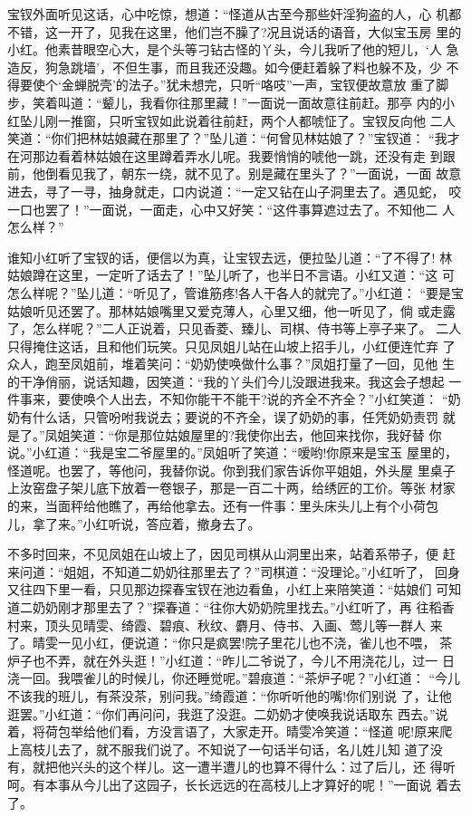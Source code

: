 宝钗外面听见这话，心中吃惊，想道：“怪道从古至今那些奸淫狗盗的人，心
机都不错，这一开了，见我在这里，他们岂不臊了?况且说话的语音，大似宝玉房
里的小红。他素昔眼空心大，是个头等刁钻古怪的丫头，今儿我听了他的短儿，‘人
急造反，狗急跳墙’，不但生事，而且我还没趣。如今便赶着躲了料也躲不及，少
不得要使个‘金蝉脱壳’的法子。”犹未想完，只听“咯吱”一声，宝钗便故意放
重了脚步，笑着叫道：“颦儿，我看你往那里藏！”一面说一面故意往前赶。那亭
内的小红坠儿刚一推窗，只听宝钗如此说着往前赶，两个人都唬怔了。宝钗反向他
二人笑道：“你们把林姑娘藏在那里了？”坠儿道：“何曾见林姑娘了？”宝钗道：
“我才在河那边看着林姑娘在这里蹲着弄水儿呢。我要悄悄的唬他一跳，还没有走
到跟前，他倒看见我了，朝东一绕，就不见了。别是藏在里头了？”一面说，一面
故意进去，寻了一寻，抽身就走，口内说道：“一定又钻在山子洞里去了。遇见蛇，
咬一口也罢了！”一面说，一面走，心中又好笑：“这件事算遮过去了。不知他二
人怎么样？”

谁知小红听了宝钗的话，便信以为真，让宝钗去远，便拉坠儿道：“了不得了!
林姑娘蹲在这里，一定听了话去了！”坠儿听了，也半日不言语。小红又道：“这
可怎么样呢？”坠儿道：“听见了，管谁筋疼!各人干各人的就完了。”小红道：
“要是宝姑娘听见还罢了。那林姑娘嘴里又爱克薄人，心里又细，他一听见了，倘
或走露了，怎么样呢？”二人正说着，只见香菱、臻儿、司棋、侍书等上亭子来了。
二人只得掩住这话，且和他们玩笑。只见凤姐儿站在山坡上招手儿，小红便连忙弃
了众人，跑至凤姐前，堆着笑问：“奶奶使唤做什么事？”凤姐打量了一回，见他
生的干净俏丽，说话知趣，因笑道：“我的丫头们今儿没跟进我来。我这会子想起
一件事来，要使唤个人出去，不知你能干不能干?说的齐全不齐全？”小红笑道：
“奶奶有什么话，只管吩咐我说去；要说的不齐全，误了奶奶的事，任凭奶奶责罚
就是了。”凤姐笑道：“你是那位姑娘屋里的?我使你出去，他回来找你，我好替
你说。”小红道：“我是宝二爷屋里的。”凤姐听了笑道：“嗳哟!你原来是宝玉
屋里的，怪道呢。也罢了，等他问，我替你说。你到我们家告诉你平姐姐，外头屋
里桌子上汝窑盘子架儿底下放着一卷银子，那是一百二十两，给绣匠的工价。等张
材家的来，当面秤给他瞧了，再给他拿去。还有一件事：里头床头儿上有个小荷包
儿，拿了来。”小红听说，答应着，撤身去了。

不多时回来，不见凤姐在山坡上了，因见司棋从山洞里出来，站着系带子，便
赶来问道：“姐姐，不知道二奶奶往那里去了？”司棋道：“没理论。”小红听了，
回身又往四下里一看，只见那边探春宝钗在池边看鱼，小红上来陪笑道：“姑娘们
可知道二奶奶刚才那里去了？”探春道：“往你大奶奶院里找去。”小红听了，再
往稻香村来，顶头见晴雯、绮霞、碧痕、秋纹、麝月、侍书、入画、莺儿等一群人
来了。晴雯一见小红，便说道：“你只是疯罢!院子里花儿也不浇，雀儿也不喂，
茶炉子也不弄，就在外头逛！”小红道：“昨儿二爷说了，今儿不用浇花儿，过一
日浇一回。我喂雀儿的时候儿，你还睡觉呢。”碧痕道：“茶炉子呢？”小红道：
“今儿不该我的班儿，有茶没茶，别问我。”绮霞道：“你听听他的嘴!你们别说
了，让他逛罢。”小红道：“你们再问问，我逛了没逛。二奶奶才使唤我说话取东
西去。”说着，将荷包举给他们看，方没言语了，大家走开。晴雯冷笑道：“怪道
呢!原来爬上高枝儿去了，就不服我们说了。不知说了一句话半句话，名儿姓儿知
道了没有，就把他兴头的这个样儿。这一遭半遭儿的也算不得什么：过了后儿，还
得听呵。有本事从今儿出了这园子，长长远远的在高枝儿上才算好的呢！”一面说
着去了。

